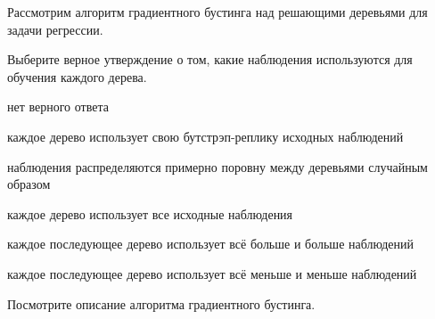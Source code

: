 
\begin{question}
Рассмотрим алгоритм градиентного бустинга над решающими деревьями для задачи регрессии.

Выберите верное утверждение о том, какие наблюдения используются для обучения каждого дерева.
\begin{answerlist}
  \item нет верного ответа
  \item каждое дерево использует свою бутстрэп-реплику исходных наблюдений
  \item наблюдения распределяются примерно поровну между деревьями случайным образом
  \item каждое дерево использует все исходные наблюдения
  \item каждое последующее дерево использует всё больше и больше наблюдений
  \item каждое последующее дерево использует всё меньше и меньше наблюдений
\end{answerlist}
\end{question}

\begin{solution}
Посмотрите описание алгоритма градиентного бустинга.
\end{solution}

